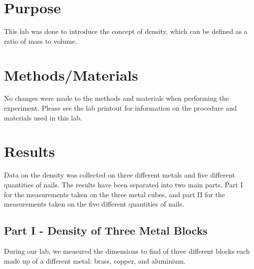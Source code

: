 \documentclass{article}
\begin{document}

\tableofcontents
\newpage

\section{Purpose}

	This lab was done to introduce the concept of density, which can be defined as a ratio of mass to volume.

\section{Methods/Materials}

	No changes were made to the methods and materials when performing the experiment. Please see the lab printout for information on the procedure and materials used in this lab.

\section{Results}

	Data on the density was collected on three different metals and five different quantities of nails. The results have been separated into two main parts. Part I for the measurements taken on the three metal cubes, and part II for the measurements taken on the five different quantities of nails.

	\subsection{Part I - Density of Three Metal Blocks}
	
	During our lab, we measured the dimensions to find  of three different blocks each made up of a different metal: brass, copper, and aluminium. 
\end{document}

